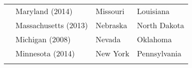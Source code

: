 \documentclass[11pt,]{article}
\begin{document}
\begin{longtable}[]{@{}llll@{}}
\begin{minipage}[t]{0.20\columnwidth}
\strut
\end{minipage} & \begin{minipage}[t]{0.26\columnwidth}\raggedright
Maryland (2014)\strut
\end{minipage} & \begin{minipage}[t]{0.24\columnwidth}\raggedright
Missouri\strut
\end{minipage} & \begin{minipage}[t]{0.19\columnwidth}\raggedright
Louisiana\strut
\end{minipage}\tabularnewline
\begin{minipage}[t]{0.20\columnwidth}\raggedright
\strut
\end{minipage} & \begin{minipage}[t]{0.26\columnwidth}\raggedright
Massachusetts (2013)\strut
\end{minipage} & \begin{minipage}[t]{0.24\columnwidth}\raggedright
Nebraska\strut
\end{minipage} & \begin{minipage}[t]{0.19\columnwidth}\raggedright
North Dakota\strut
\end{minipage}\tabularnewline
\begin{minipage}[t]{0.20\columnwidth}\raggedright
\strut
\end{minipage} & \begin{minipage}[t]{0.26\columnwidth}\raggedright
Michigan (2008)\strut
\end{minipage} & \begin{minipage}[t]{0.24\columnwidth}\raggedright
Nevada\strut
\end{minipage} & \begin{minipage}[t]{0.19\columnwidth}\raggedright
Oklahoma\strut
\end{minipage}\tabularnewline
\begin{minipage}[t]{0.20\columnwidth}\raggedright
\strut
\end{minipage} & \begin{minipage}[t]{0.26\columnwidth}\raggedright
Minnesota (2014)\strut
\end{minipage} & \begin{minipage}[t]{0.24\columnwidth}\raggedright
New York\strut
\end{minipage} & \begin{minipage}[t]{0.19\columnwidth}\raggedright
Pennsylvania\strut
\end{minipage}\tabularnewline
\begin{minipage}[t]{0.20\columnwidth}\raggedright

\end{minipage}
\end{longtable}
\end{document}
